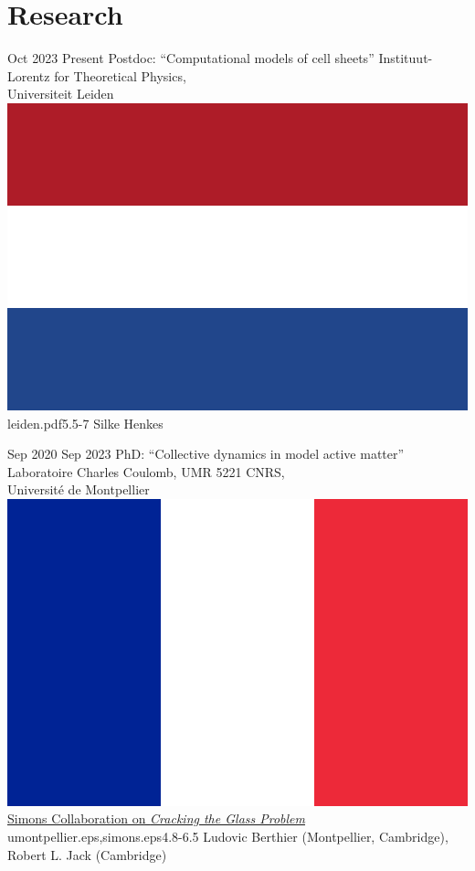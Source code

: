 \documentclass[a4paper]{cvtemplate_en} %
\begin{document}
\makeprofile %


\vspace{2mm}
\section{Research}

\begin{cvbody}

\cvitem
	{Oct 2023}
	{Present}
  {Postdoc: ``Computational models of cell sheets''}
  {Instituut-Lorentz for Theoretical Physics,\\ Universiteit Leiden \includegraphics[height=0.8\myheight]{nl}}
  {leiden.pdf}{5.5}{-7}
	{Silke Henkes}
  {\\}

\cvitem
	{Sep 2020}
	{Sep 2023}
  {PhD: ``Collective dynamics in model active matter''}
  {Laboratoire Charles Coulomb, UMR 5221 CNRS,\\ Universit\'e de Montpellier \includegraphics[height=0.8\myheight]{fr}\\
  \href{https://scglass.uchicago.edu}{Simons Collaboration on \textit{Cracking the Glass Problem}}}
  {umontpellier.eps,simons.eps}{4.8}{-6.5}
	{Ludovic Berthier (Montpellier, Cambridge),\\ Robert L. Jack (Cambridge)}
  {\\}


\end{cvbody}
\end{document}
